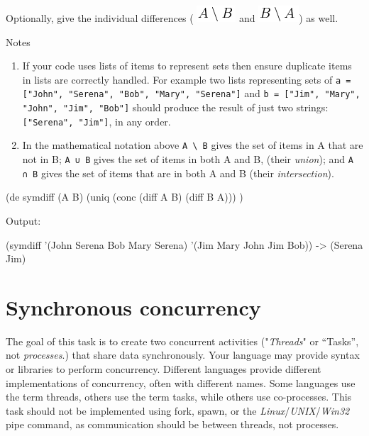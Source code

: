 Optionally, give the individual differences
( \includegraphics[scale=.6]{graphics/2958d3ea0159c6ad2ed45f5804fce621.png}
and  
 \includegraphics[scale=.6]{graphics/07915cb82d7470aff79636e93397abe3.png})
as well.

Notes

\begin{enumerate}
\item If your code uses lists of items to represent sets then ensure
  duplicate items in lists are correctly handled. For example two
  lists representing sets of \texttt{a = {[}"John", "Serena", "Bob",
    "Mary", }\texttt{"Serena"{]}} and \texttt{b = {[}"Jim", "Mary",
    "John", "Jim", "Bob"{]}} should produce the result of just two
  strings: \texttt{{[}"Serena", "Jim"{]}}, in any order.
\item
  In the mathematical notation above \texttt{A \textbackslash{} B} gives
  the set of items in A that are not in B; \texttt{A ∪ B} gives the set
  of items in both A and B, (their \emph{union}); and \texttt{A ∩ B}
  gives the set of items that are in both A and B (their
  \emph{intersection}).
\end{enumerate}



\begin{wideverbatim}

(de symdiff (A B)
   (uniq (conc (diff A B) (diff B A))) )

Output:

(symdiff '(John Serena Bob Mary Serena) '(Jim Mary John Jim Bob))
-> (Serena Jim)

\end{wideverbatim}

\pagebreak{}
\section*{Synchronous concurrency}


The goal of this task is to create two concurrent activities
("\emph{Threads}" or ``Tasks'', not \emph{processes}.) that share data
synchronously. Your language may provide syntax or libraries to
perform concurrency. Different languages provide different
implementations of concurrency, often with different names. Some
languages use the term threads, others use the term tasks, while
others use co-processes. This task should not be implemented using
fork, spawn, or the \emph{Linux}/\emph{UNIX}/\emph{Win32} pipe
command, as communication should be between threads, not processes.

